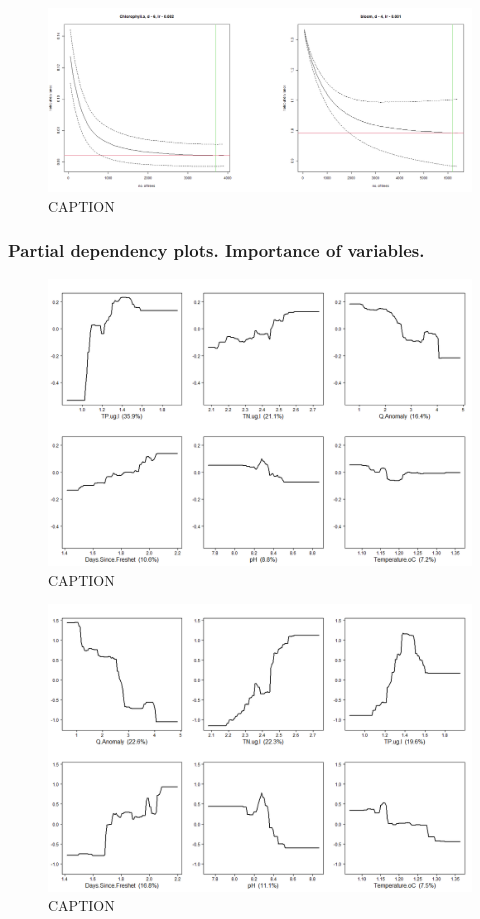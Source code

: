 \documentclass[
]{article}
\begin{document}
\begin{figure}
\centering
\includegraphics{Manuscript_files/FIGURES/Holdout_Dev.png}
\caption{CAPTION}
\end{figure}

\hypertarget{partial-dependency-plots.-importance-of-variables.}{%
\subsubsection{Partial dependency plots. Importance of
variables.}\label{partial-dependency-plots.-importance-of-variables.}}

\begin{figure}
\centering
\includegraphics{Manuscript_files/FIGURES/Part_Dep_SS.png}
\caption{CAPTION}
\end{figure}

\begin{figure}
\centering
\includegraphics{Manuscript_files/FIGURES/Part_Dep_BNB.png}
\caption{CAPTION}
\end{figure}
\end{document}
